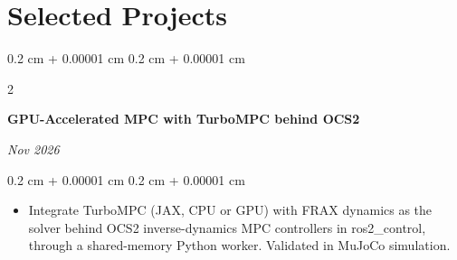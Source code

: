 \documentclass[10pt, letterpaper]{article}
\newenvironment{highlights}{
    \begin{itemize}[
        topsep=0.10 cm,
        parsep=0.10 cm,
        partopsep=0pt,
        itemsep=0pt,
        leftmargin=0.4 cm + 10pt
    ]
}{
    \end{itemize}
} %
\newenvironment{onecolentry}{
    \begin{adjustwidth}{
        0.2 cm + 0.00001 cm
    }{
        0.2 cm + 0.00001 cm
    }
}{
    \end{adjustwidth}
} %
\newenvironment{twocolentry}[2][4.5 cm]{
    \needspace{4\baselineskip}%
    \onecolentry
    \def\secondColumn{#2}
    \setcolumnwidth{\fill, #1}
    \begin{paracol}{2}
}{
    \switchcolumn \raggedleft \secondColumn
    \end{paracol}
    \endonecolentry
} %
\let\hrefWithoutArrow\href
\renewcommand{\href}[2]{\hrefWithoutArrow{#1}{\ifthenelse{\equal{#2}{}}{ }{#2 }\raisebox{.15ex}{\footnotesize \faExternalLink*}}}
\begin{document}








    \section{Selected Projects}

        \begin{twocolentry}[4.9 cm]{
        \textit{Nov 2026}
        }
            \textbf{GPU-Accelerated MPC with TurboMPC behind OCS2}
        \end{twocolentry}
        \vspace{0.10 cm}
        \begin{onecolentry}
            \begin{highlights}
                \item Integrate TurboMPC (JAX, CPU or GPU) with FRAX dynamics as the solver behind OCS2 inverse-dynamics MPC controllers in ros2\_control, through a shared-memory Python worker. Validated in MuJoCo simulation.
            \end{highlights}
        \end{onecolentry}
        \vspace{0.2 cm}
\end{document}
